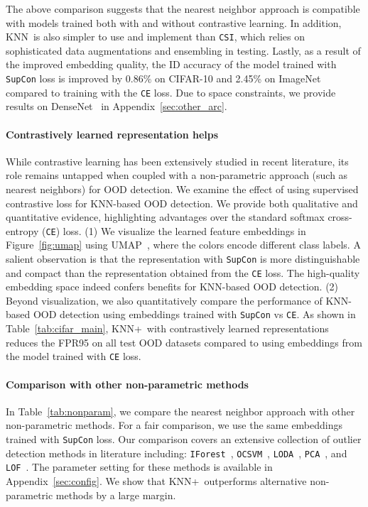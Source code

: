 \documentclass[nohyperref]{article}
\newcommand{\method}{{KNN}}
\newcommand{\methodplus}{{KNN+}}
\theoremstyle{plain}
\theoremstyle{definition}
\theoremstyle{remark}
\begin{document}
	\vspace{-0.2cm}
The above comparison suggests that the nearest neighbor approach is compatible with models trained both with and without contrastive learning. In addition, \method~is also simpler to use and implement than \texttt{CSI}, which relies on sophisticated data augmentations and ensembling in testing. Lastly, as a result of the improved embedding quality, the ID accuracy of the model trained with \texttt{SupCon} loss is improved by ${0.86}\%$ on CIFAR-10 and 2.45\% on ImageNet compared to training with the \texttt{CE} loss. 
Due to space constraints, we provide results on  DenseNet~\citep{huang2017densely} in Appendix~\ref{sec:other_arc}. 




\paragraph{Contrastively learned representation helps} While contrastive learning has been extensively studied in recent literature, {its role remains untapped when coupled with a non-parametric approach} (such as nearest neighbors) for OOD detection. We examine the effect of using supervised contrastive loss for KNN-based OOD detection. We provide both qualitative and quantitative evidence, highlighting advantages over the standard softmax cross-entropy (\texttt{CE}) loss. (1) We visualize the learned feature embeddings in Figure~\ref{fig:umap} using UMAP~\citep{mcinnes2018umap-software}, where the colors encode different class labels. A salient observation is that the representation with \texttt{SupCon} is more distinguishable and compact than the representation obtained from the \texttt{CE} loss. The high-quality embedding space indeed confers benefits for KNN-based OOD detection. (2) Beyond visualization, we also quantitatively compare the performance of KNN-based OOD detection using embeddings trained with \texttt{SupCon} vs \texttt{CE}. As shown in 
Table~\ref{tab:cifar_main}, \methodplus~with contrastively learned representations reduces the FPR95 on all test OOD datasets compared to using embeddings from the model trained with \texttt{CE} loss. 



\vspace{-0.2cm}
\paragraph{Comparison with other non-parametric methods } In Table~\ref{tab:nonparam}, we compare the nearest neighbor approach with other non-parametric methods. For a fair comparison, we use the same embeddings trained with \texttt{SupCon} loss. Our comparison  covers  an  extensive  collection of outlier detection methods in literature including: \texttt{IForest}~\citep{liu2008iforest}, \texttt{OCSVM}~\citep{bernhard2001ocsvm}, 
\texttt{LODA}~\citep{2016loda}, 
\texttt{PCA}~\citep{shyu2003pca}, and
\texttt{LOF}~\citep{breunig2000lof}. The parameter setting for these methods is available in Appendix~\ref{sec:config}. We show that \methodplus~outperforms alternative non-parametric methods by a large margin. 
\end{document}
